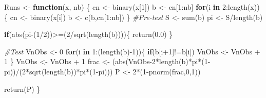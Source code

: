 \documentclass[
]{article}
\newenvironment{Shaded}{\begin{snugshade}}{\end{snugshade}}
\newcommand{\CommentTok}[1]{\textcolor[rgb]{0.56,0.35,0.01}{\textit{#1}}}
\newcommand{\ControlFlowTok}[1]{\textcolor[rgb]{0.13,0.29,0.53}{\textbf{#1}}}
\newcommand{\DecValTok}[1]{\textcolor[rgb]{0.00,0.00,0.81}{#1}}
\newcommand{\FloatTok}[1]{\textcolor[rgb]{0.00,0.00,0.81}{#1}}
\newcommand{\FunctionTok}[1]{\textcolor[rgb]{0.00,0.00,0.00}{#1}}
\newcommand{\NormalTok}[1]{#1}
\newcommand{\OtherTok}[1]{\textcolor[rgb]{0.56,0.35,0.01}{#1}}
\newcommand{\SpecialCharTok}[1]{\textcolor[rgb]{0.00,0.00,0.00}{#1}}
\begin{document}
\begin{Shaded}
\begin{Highlighting}[]
\NormalTok{Runs }\OtherTok{\textless{}{-}} \ControlFlowTok{function}\NormalTok{(x, nb)}
\NormalTok{\{}
\NormalTok{  cn }\OtherTok{\textless{}{-}} \FunctionTok{binary}\NormalTok{(x[}\DecValTok{1}\NormalTok{])}
\NormalTok{  b }\OtherTok{\textless{}{-}}\NormalTok{ cn[}\DecValTok{1}\SpecialCharTok{:}\NormalTok{nb]}
  \ControlFlowTok{for}\NormalTok{(i }\ControlFlowTok{in} \DecValTok{2}\SpecialCharTok{:}\FunctionTok{length}\NormalTok{(x))\{}
\NormalTok{    cn }\OtherTok{\textless{}{-}} \FunctionTok{binary}\NormalTok{(x[i])}
\NormalTok{    b }\OtherTok{\textless{}{-}} \FunctionTok{c}\NormalTok{(b,cn[}\DecValTok{1}\SpecialCharTok{:}\NormalTok{nb])}
\NormalTok{  \}}
  \CommentTok{\#Pre{-}test}
\NormalTok{  S }\OtherTok{\textless{}{-}} \FunctionTok{sum}\NormalTok{(b)}
\NormalTok{  pi }\OtherTok{\textless{}{-}}\NormalTok{ S}\SpecialCharTok{/}\FunctionTok{length}\NormalTok{(b)}
  
  \ControlFlowTok{if}\NormalTok{(}\FunctionTok{abs}\NormalTok{(pi}\SpecialCharTok{{-}}\NormalTok{(}\DecValTok{1}\SpecialCharTok{/}\DecValTok{2}\NormalTok{))}\SpecialCharTok{\textgreater{}=}\NormalTok{(}\DecValTok{2}\SpecialCharTok{/}\FunctionTok{sqrt}\NormalTok{(}\FunctionTok{length}\NormalTok{(b))))\{}
    \FunctionTok{return}\NormalTok{(}\FloatTok{0.0}\NormalTok{)}
\NormalTok{  \}}
  
  \CommentTok{\#Test}
\NormalTok{  VnObs }\OtherTok{\textless{}{-}} \DecValTok{0}
  \ControlFlowTok{for}\NormalTok{(i }\ControlFlowTok{in} \DecValTok{1}\SpecialCharTok{:}\NormalTok{(}\FunctionTok{length}\NormalTok{(b)}\SpecialCharTok{{-}}\DecValTok{1}\NormalTok{))\{}
    \ControlFlowTok{if}\NormalTok{(b[i}\SpecialCharTok{+}\DecValTok{1}\NormalTok{]}\SpecialCharTok{!=}\NormalTok{b[i])}
\NormalTok{      VnObs }\OtherTok{\textless{}{-}}\NormalTok{ VnObs }\SpecialCharTok{+} \DecValTok{1}
\NormalTok{  \}}
\NormalTok{  VnObs }\OtherTok{\textless{}{-}}\NormalTok{ VnObs }\SpecialCharTok{+} \DecValTok{1}
\NormalTok{  frac }\OtherTok{\textless{}{-}}\NormalTok{ (}\FunctionTok{abs}\NormalTok{(VnObs}\DecValTok{{-}2}\SpecialCharTok{*}\FunctionTok{length}\NormalTok{(b)}\SpecialCharTok{*}\NormalTok{pi}\SpecialCharTok{*}\NormalTok{(}\DecValTok{1}\SpecialCharTok{{-}}\NormalTok{pi))}\SpecialCharTok{/}\NormalTok{(}\DecValTok{2}\SpecialCharTok{*}\FunctionTok{sqrt}\NormalTok{(}\FunctionTok{length}\NormalTok{(b))}\SpecialCharTok{*}\NormalTok{pi}\SpecialCharTok{*}\NormalTok{(}\DecValTok{1}\SpecialCharTok{{-}}\NormalTok{pi)))}
\NormalTok{  P }\OtherTok{\textless{}{-}} \DecValTok{2}\SpecialCharTok{*}\NormalTok{(}\DecValTok{1}\SpecialCharTok{{-}}\FunctionTok{pnorm}\NormalTok{(frac,}\DecValTok{0}\NormalTok{,}\DecValTok{1}\NormalTok{))}
  
  \FunctionTok{return}\NormalTok{(P)}
\NormalTok{\}}
\end{Highlighting}
\end{Shaded}
\end{document}
